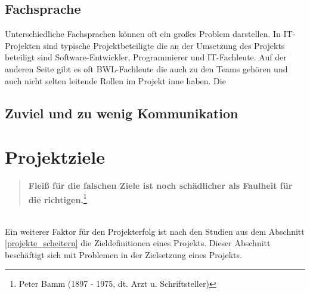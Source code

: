 \documentclass[12pt]{scrartcl}
\begin{document}
\subsection{Fachsprache}
Unterschiedliche Fachsprachen können oft ein großes Problem darstellen. In IT-Projekten sind typische Projektbeteiligte die an der Umsetzung des Projekts beteiligt sind Software-Entwickler, Programmierer und IT-Fachleute. Auf der anderen Seite gibt es oft BWL-Fachleute die auch zu den Teams gehören und auch nicht selten leitende Rollen im Projekt inne haben. Die 


\subsection{Zuviel und zu wenig Kommunikation}


\cite{profPM}
\cite{scriptPM}
\cite{chaosReportCriteria}


\pagebreak
\section{Projektziele}
\begin{quote}
\colorbox{blue!5}{\textbf{Fleiß für die falschen Ziele ist noch schädlicher als Faulheit für die richtigen.}}\footnote{Peter Bamm (1897 - 1975, dt. Arzt u. Schriftsteller)}
\end{quote}
\ \\
Ein weiterer Faktor für den Projekterfolg ist nach den Studien aus dem Abschnitt \ref{projekte_scheitern} die Zieldefinitionen eines Projekts. Dieser Abschnitt beschäftigt sich mit Problemen in der Zielsetzung eines Projekts. 
\end{document}
